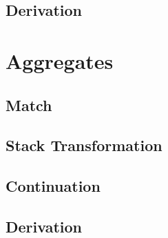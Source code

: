 \subsection{Derivation}



\section{Aggregates}
\subsection{Match}



\subsection{Stack Transformation}

\subsection{Continuation}



\subsection{Derivation}

